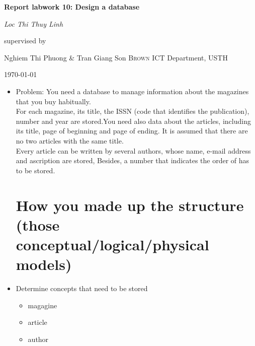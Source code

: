 \documentclass[13pt,a4paper]{report}
\begin{document}
\begin{titlepage}
	\centering
	\vspace{2cm}
	{\huge\bfseries Report labwork 10: Design a database \par}
	\vspace{2cm}
	{\Large\itshape Loc Thi Thuy Linh\par}
	\vfill
	supervised by\par
	Nghiem Thi Phuong \& Tran Giang Son \textsc{Brown}
	ICT Department, USTH\par
	\vfill
	{\large \today\par}
\end{titlepage}

\begin{itemize}
\item Problem:
\indent You need a database to manage information about the magazines that you
buy habitually.
\\
\indent For each magazine, its title, the ISSN (code that identifies the publication),
number and year are stored.You need also data about the articles, including
its title, page of beginning and page of ending. It is assumed that there are
no two articles with the same title.
\\
\indent Every article can be written by several authors, whose name, e-mail address
and ascription are stored, Besides, a number that indicates the order of has
to be stored.

\section{ How you made up the structure (those conceptual/logical/physical models) }

\item Determine concepts that need to be stored
	\begin{itemize}
	\item magagine
	\item article
	\item author
	\end{itemize}


\end{itemize}
\end{document}
